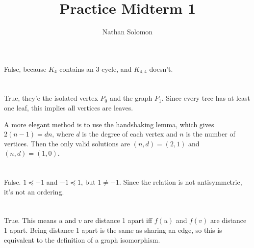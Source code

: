 \documentclass[12pt]{article}
\begin{document}
\title{Practice Midterm 1}
\author{Nathan Solomon}
\maketitle

\section{}
\noindent{}\bigskip\par

False, because $K_4$ contains an 3-cycle, and $K_{4,4}$ doesn't.

\section{}
\noindent{}\bigskip\par
True, they'e the isolated vertex $P_0$ and the graph $P_1$. Since every tree has at least one leaf, this implies all vertices are leaves.
\par
A more elegant method is to use the handshaking lemma, which gives $2(n-1)=dn$, where $d$ is the degree of each vertex and $n$ is the number of vertices. Then the only valid solutions are $(n,d)=(2,1)$ and $(n,d)=(1,0)$.

\section{}
\noindent{}\bigskip\par
False. $1 \preceq -1$ and $-1 \preceq 1$, but $1 \neq -1$. Since the relation is not antisymmetric, it's not an ordering.

\section{}
\noindent{}\bigskip\par
True. This means $u$ and $v$ are distance 1 apart iff $f(u)$ and $f(v)$ are distance 1 apart. Being distance 1 apart is the same as sharing an edge, so this is equivalent to the definition of a graph isomorphism.
\end{document}
